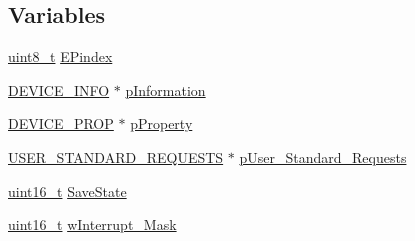 \subsection*{Variables}
\begin{DoxyCompactItemize}
\item 
\hyperlink{stdint_8h_aba7bc1797add20fe3efdf37ced1182c5}{uint8\-\_\-t} \hyperlink{_s_t_m32_f30x_2_libraries_2_s_t_m32___u_s_b-_f_s-_device___driver_2inc_2usb__init_8h_a227b4da72d62002d4c00ea5e82ba83c9}{E\-Pindex}
\item 
\hyperlink{_s_t_m32_f10x_2_libraries_2_s_t_m32___u_s_b-_f_s-_device___driver_2inc_2usb__core_8h_a6c959d0e0181f5f4b6a8b6b3f8e16760}{D\-E\-V\-I\-C\-E\-\_\-\-I\-N\-F\-O} $\ast$ \hyperlink{_s_t_m32_f30x_2_libraries_2_s_t_m32___u_s_b-_f_s-_device___driver_2inc_2usb__init_8h_aee2c852e2abf0858434a286864925289}{p\-Information}
\item 
\hyperlink{_s_t_m32_f10x_2_libraries_2_s_t_m32___u_s_b-_f_s-_device___driver_2inc_2usb__core_8h_a90353becd4185446508b796a7f39fbce}{D\-E\-V\-I\-C\-E\-\_\-\-P\-R\-O\-P} $\ast$ \hyperlink{_s_t_m32_f30x_2_libraries_2_s_t_m32___u_s_b-_f_s-_device___driver_2inc_2usb__init_8h_a097ddc79931f5731f55b4c7d4874ea7e}{p\-Property}
\item 
\hyperlink{_s_t_m32_f10x_2_libraries_2_s_t_m32___u_s_b-_f_s-_device___driver_2inc_2usb__core_8h_abf9887b82ae511cfb155d0d97c9a7c1a}{U\-S\-E\-R\-\_\-\-S\-T\-A\-N\-D\-A\-R\-D\-\_\-\-R\-E\-Q\-U\-E\-S\-T\-S} $\ast$ \hyperlink{_s_t_m32_f30x_2_libraries_2_s_t_m32___u_s_b-_f_s-_device___driver_2inc_2usb__init_8h_a54cd36264ecd2640f1812a61a6d66bfb}{p\-User\-\_\-\-Standard\-\_\-\-Requests}
\item 
\hyperlink{stdint_8h_a273cf69d639a59973b6019625df33e30}{uint16\-\_\-t} \hyperlink{_s_t_m32_f30x_2_libraries_2_s_t_m32___u_s_b-_f_s-_device___driver_2inc_2usb__init_8h_af8f4742d656fff9ee1db1ef79a53150a}{Save\-State}
\item 
\hyperlink{stdint_8h_a273cf69d639a59973b6019625df33e30}{uint16\-\_\-t} \hyperlink{_s_t_m32_f30x_2_libraries_2_s_t_m32___u_s_b-_f_s-_device___driver_2inc_2usb__init_8h_a6304592c11373c53999f23226cb5e5d7}{w\-Interrupt\-\_\-\-Mask}
\end{DoxyCompactItemize}


